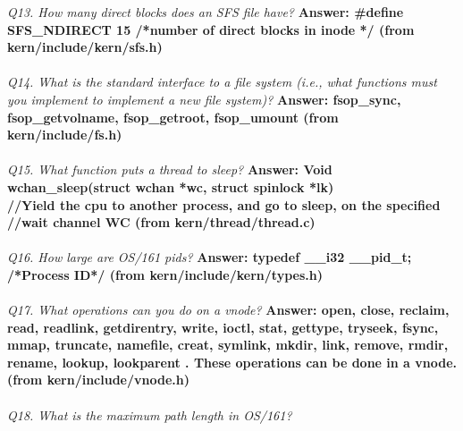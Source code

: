\documentclass[11pt, english]{article}
\begin{document}
	\textit{Q13. How many direct blocks does an SFS file have?}\newline 
	\textbf{Answer: \#define SFS\_NDIRECT  15 /*number of direct blocks in inode */ (from kern/include/kern/sfs.h)}\\ \\ 
	\textit{Q14.  What is the standard interface to a file system (i.e., what functions must you implement to implement a new file system)?}\newline 
	\textbf{Answer: fsop\_sync, fsop\_getvolname, fsop\_getroot, fsop\_umount (from kern/include/fs.h)}\\ \\ 
	\textit{Q15. What function puts a thread to sleep?}\newline 
	\textbf{Answer: Void wchan\_sleep(struct wchan *wc, struct spinlock *lk)
	\\//Yield the cpu to another process, and go to sleep, on the specified 
	\\//wait channel WC (from kern/thread/thread.c)}\\ \\ 
	\textit{Q16. How large are OS/161 pids?}\newline 
	\textbf{Answer: typedef  \_\_i32 \_\_pid\_t; /*Process ID*/ (from kern/include/kern/types.h)}\\ \\ 
	\textit{Q17. What operations can you do on a vnode?}\newline 
	\textbf{Answer: open, close, reclaim, read, readlink, getdirentry, write, ioctl, stat, gettype, tryseek, fsync, mmap, truncate, namefile, creat, symlink, mkdir, link, remove, rmdir, rename, lookup, lookparent . These operations can be done in a vnode. (from kern/include/vnode.h)}\\ \\ 
	\textit{Q18. What is the maximum path length in OS/161?}\newline 
\end{document}
